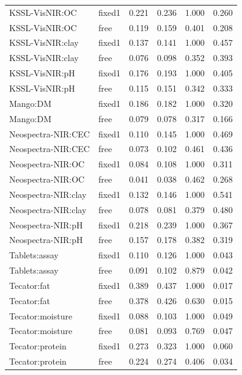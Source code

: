 \begin{tabular}{llllll}
KSSL-VisNIR:OC & fixed1 & 0.221 & 0.236 & 1.000 & 0.260 \\
KSSL-VisNIR:OC & free & 0.119 & 0.159 & 0.401 & 0.208 \\
KSSL-VisNIR:clay & fixed1 & 0.137 & 0.141 & 1.000 & 0.457 \\
KSSL-VisNIR:clay & free & 0.076 & 0.098 & 0.352 & 0.393 \\
KSSL-VisNIR:pH & fixed1 & 0.176 & 0.193 & 1.000 & 0.405 \\
KSSL-VisNIR:pH & free & 0.115 & 0.151 & 0.342 & 0.333 \\
Mango:DM & fixed1 & 0.186 & 0.182 & 1.000 & 0.320 \\
Mango:DM & free & 0.079 & 0.078 & 0.317 & 0.166 \\
Neospectra-NIR:CEC & fixed1 & 0.110 & 0.145 & 1.000 & 0.469 \\
Neospectra-NIR:CEC & free & 0.073 & 0.102 & 0.461 & 0.436 \\
Neospectra-NIR:OC & fixed1 & 0.084 & 0.108 & 1.000 & 0.311 \\
Neospectra-NIR:OC & free & 0.041 & 0.038 & 0.462 & 0.268 \\
Neospectra-NIR:clay & fixed1 & 0.132 & 0.146 & 1.000 & 0.541 \\
Neospectra-NIR:clay & free & 0.078 & 0.081 & 0.379 & 0.480 \\
Neospectra-NIR:pH & fixed1 & 0.218 & 0.239 & 1.000 & 0.367 \\
Neospectra-NIR:pH & free & 0.157 & 0.178 & 0.382 & 0.319 \\
Tablets:assay & fixed1 & 0.110 & 0.126 & 1.000 & 0.043 \\
Tablets:assay & free & 0.091 & 0.102 & 0.879 & 0.042 \\
Tecator:fat & fixed1 & 0.389 & 0.437 & 1.000 & 0.017 \\
Tecator:fat & free & 0.378 & 0.426 & 0.630 & 0.015 \\
Tecator:moisture & fixed1 & 0.088 & 0.103 & 1.000 & 0.049 \\
Tecator:moisture & free & 0.081 & 0.093 & 0.769 & 0.047 \\
Tecator:protein & fixed1 & 0.273 & 0.323 & 1.000 & 0.060 \\
Tecator:protein & free & 0.224 & 0.274 & 0.406 & 0.034 \\
\hline
\end{tabular}
